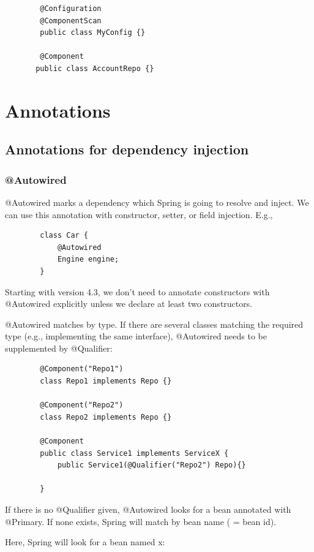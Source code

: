\documentclass{scrartcl}
\begin{document}
    \begin{lstlisting}
        @Configuration
        @ComponentScan
        public class MyConfig {}

        @Component
       public class AccountRepo {}
    \end{lstlisting}


\section{Annotations}
\subsection{Annotations for dependency injection}
\subsubsection{@Autowired}
    @Autowired marks a dependency which Spring is going to resolve and inject. We can use this annotation with constructor, setter, or field injection. E.g.,

    \begin{lstlisting}
        class Car {
            @Autowired
            Engine engine;
        }
    \end{lstlisting}

    Starting with version 4.3, we don’t need to annotate constructors with @Autowired explicitly unless we declare at least two constructors.

    @Autowired matches by type. If there are several classes matching the required type (e.g., implementing the same interface), @Autowired needs to be supplemented by @Qualifier:

    \begin{lstlisting}
        @Component("Repo1")
        class Repo1 implements Repo {}

        @Component("Repo2")
        class Repo2 implements Repo {}

        @Component
        public class Service1 implements ServiceX {
            public Service1(@Qualifier("Repo2") Repo){}

        }

    \end{lstlisting}

    If there is no @Qualifier given, @Autowired looks for a bean annotated with @Primary. If none exists, Spring will match by bean name ( = bean id).

    Here, Spring will look for a bean named x:
\end{document}
